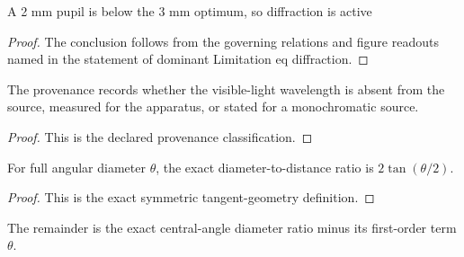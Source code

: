 \begin{lemma}
  \label{lem:physics:phyx-mini-0075:phyxminiproblems-problemphyxmini0075-dominantlimitation-eq-diffraction}
  A 2 mm pupil is below the 3 mm optimum, so diffraction is active
\end{lemma}
\begin{proof}
  The conclusion follows from the governing relations and figure readouts named in the statement of dominant Limitation eq diffraction.
\end{proof}
\begin{definition}
  \label{def:physics:phyx-mini-0075:phyxminiproblems-problemphyxmini0075-wavelengthprovenance}
  The provenance records whether the visible-light wavelength is absent from the source, measured for the apparatus, or stated for a monochromatic source.
\end{definition}
\begin{proof}
  This is the declared provenance classification.
\end{proof}
\begin{definition}
  \label{def:physics:phyx-mini-0075:phyxminiproblems-problemphyxmini0075-centralanglediameterratio}
  For full angular diameter $\theta$, the exact diameter-to-distance ratio is $2\tan(\theta/2)$.
\end{definition}
\begin{proof}
  This is the exact symmetric tangent-geometry definition.
\end{proof}
\begin{definition}
  \label{def:physics:phyx-mini-0075:phyxminiproblems-problemphyxmini0075-paraxialangularremainder}
  The remainder is the exact central-angle diameter ratio minus its first-order term $\theta$.
\end{definition}
